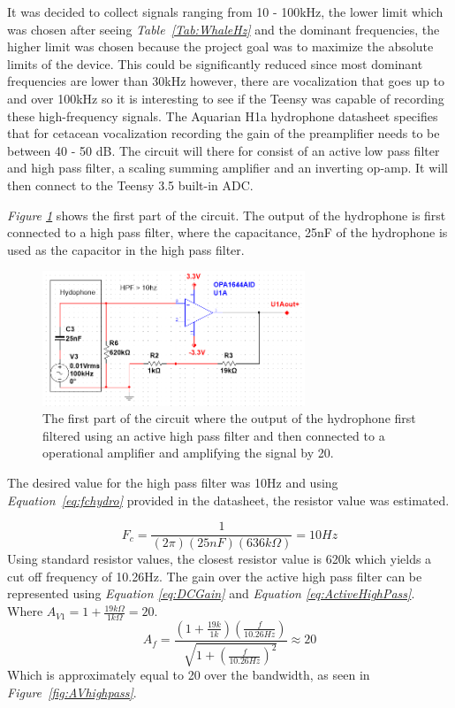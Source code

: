 It was decided to collect signals ranging from 10 - 100kHz, the lower limit which was chosen after seeing \textit{Table~\ref{Tab:WhaleHz}} and the dominant frequencies, the higher limit was chosen because the project goal was to maximize the absolute limits of the device.
This could be significantly reduced since most dominant frequencies are lower than 30kHz however, there are vocalization that goes up to and over 100kHz so it is interesting to see if the Teensy was capable of recording these high-frequency signals.
The Aquarian H1a hydrophone datasheet specifies that for cetacean vocalization recording the gain of the preamplifier needs to be between 40 - 50 dB\cite{noauthor_aquarian_nodate}.
The circuit will there for consist of an active low pass filter and high pass filter, a scaling summing amplifier and an inverting op-amp.
It will then connect to the Teensy 3.5 built-in ADC.

\textit{Figure \ref{fig:Opamp1}} shows the first part of the circuit.
The output of the hydrophone is first connected to a high pass filter, where the capacitance, 25nF of the hydrophone is used as the capacitor in the high pass filter.

\begin{figure}[h]
    \centering
    \includegraphics[width=0.70\textwidth]{graphics/OPamp1.png}
    \caption{The first part of the circuit where the output of the hydrophone first filtered using an active high pass filter and then connected to a operational amplifier and amplifying the signal by 20.}
    \label{fig:Opamp1}
\end{figure}


The desired value for the high pass filter was 10Hz and using \textit{Equation~\ref{eq:fchydro}} provided in the datasheet, the resistor value was estimated.   

$$F_c = \frac{1}{(2\pi)( 25nF )( 636k\Omega)} = 10Hz$$
Using standard resistor values, the closest resistor value is 620k which yields a cut off frequency of 10.26Hz.
The gain over the active high pass filter can be represented using \textit{Equation \ref{eq:DCGain}} and \textit{Equation \ref{eq:ActiveHighPass}}. 
Where $A_{V1} = 1 + \frac{19k\Omega}{1k\Omega} = 20$.
$$A_f = \frac{(1+\frac{19k}{1k})(\frac{f}{10.26Hz})}{\sqrt{1 + (\frac{f}{10.26Hz})^2}} \approx 20$$
Which is approximately equal to 20 over the bandwidth, as seen in \textit{Figure~\ref{fig:AVhighpass}}.

